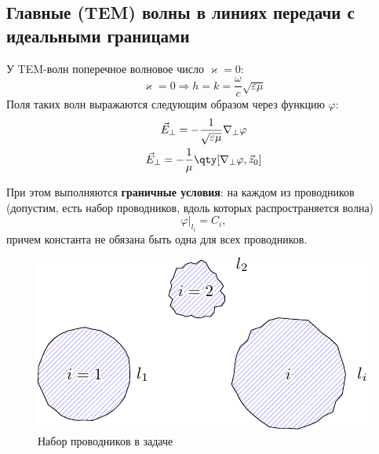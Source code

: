 \subsection{Главные (TEM) волны в линиях передачи с идеальными границами}

У TEM-волн поперечное волновое число $\varkappa=0$:
\begin{equation}
	\varkappa=0 \Rightarrow h=k= \frac{\omega}{c}\sqrt{\varepsilon \mu}
\end{equation}
Поля таких волн выражаются следующим образом через функцию $\varphi$:
\begin{gather}
	\label{eperp}
	\vec{E}_\perp=-\frac{1}{\sqrt{\varepsilon \mu}}\nabla_\perp \varphi\\
	\vec{E}_\perp=-\frac{1}{\mu}\qty[\nabla_\perp \varphi,\vec{z}_0]
\end{gather}

При этом выполняются \textbf{граничные условия}: на каждом из проводников (допустим, есть набор проводников, вдоль которых распространяется волна)
\begin{equation}
	\varphi|_{l_i}=C_i,
\end{equation}
причем константа не обязана быть одна для всех проводников.

\begin{figure}[H]
	\centering
	\includegraphics[scale=1.5]{img/lect4_ris1}
	\caption{Набор проводников в задаче}
	\label{fig:lect4:1}
\end{figure}

